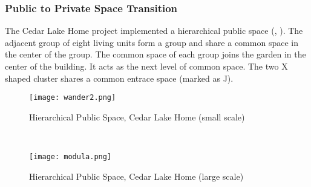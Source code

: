 \subsubsection{Public to Private Space Transition}
The Cedar Lake Home project implemented a hierarchical public space
(, ). The adjacent group of eight
living units form a group and share a common space in the center of
the group. The common space of each group joins the garden in the
center of the building. It acts as the next level of common space. The
two X shaped cluster shares a common entrace space (marked as J).
\begin{figure}[h!]
  \centering
  \texttt{[image: wander2.png]}
  \caption[Hierarchical Public Space, Cedar Lake Home]{Hierarchical
    Public Space, Cedar Lake Home (small scale) ~\cite{dementiaCase}}
  \label{fig:wander2}
\end{figure}
~
\begin{figure}[t]
  \centering
  \texttt{[image: modula.png]}
  \caption[Hierarchical Public Space, Cedar Lake Home]{Hierarchical
    Public Space, Cedar Lake Home (large scale)~\cite{dementiaCase}}
  \label{fig:modula}
\end{figure}

